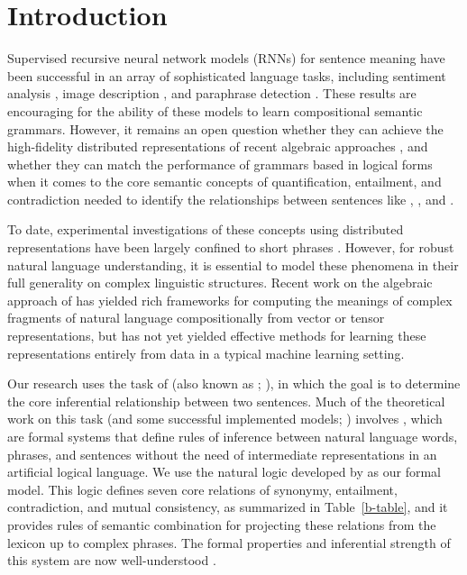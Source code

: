 \section{Introduction}\label{sec:intro}

Supervised recursive neural network models (RNNs) for sentence meaning
have been successful in an array of sophisticated language tasks,
including sentiment analysis \cite{socher2011semi,socher2013acl1},
image description \cite{sochergrounded}, and paraphrase detection
\cite{Socher-etal:2011:Paraphrase}. These results are encouraging for
the ability of these models to learn compositional semantic grammars.
However, it remains an open question whether they can achieve the
high-fidelity distributed representations of recent algebraic
approaches \cite{ClarkCoeckeSadrzadeh2011,grefenstette2013towards,rocktaschellow},
and whether they can match the performance of grammars based in logical forms
\cite{Warren:Pereira:1982,Zelle:Mooney:1996,ZetCol:2005,LiangJordan:2013}
when it comes to the core semantic concepts of quantification,
entailment, and contradiction needed to identify the relationships
between sentences like , , and .

To date, experimental investigations of these concepts using
distributed representations have been largely confined to short
phrases \cite{Mitchell:Lapata:2010,Grefenstette-etal:2011,baroni2012entailment}.
However, for robust natural language understanding, it is essential to
model these phenomena in their full generality on complex linguistic
structures. Recent work on the algebraic approach of
 has yielded rich frameworks 
for computing the meanings of complex fragments of natural
language compositionally from vector or tensor representations, but 
has not yet yielded effective methods for learning these representations
entirely from data in a typical machine learning setting.

Our research uses the task of  
(also known as ;
\citealt{dagan2006pascal}), in which the goal is to determine the core
inferential relationship between two sentences. Much of the
theoretical work on this task (and some successful implemented models;
\citealt{maccartney2009extended,watanabe2012latent}) involves , which are formal systems that define rules of inference
between natural language words, phrases, and sentences without the
need of intermediate representations in an artificial logical
language. We use the natural logic developed by
 as our formal model. This logic
defines seven core relations of synonymy, entailment, contradiction,
and mutual consistency, as summarized in Table~\ref{b-table}, and it
provides rules of semantic combination for projecting these relations
from the lexicon up to complex phrases. The formal properties and
inferential strength of this system are now well-understood
\cite{Icard:Moss:2013,Icard:Moss:2013:LILT}.

